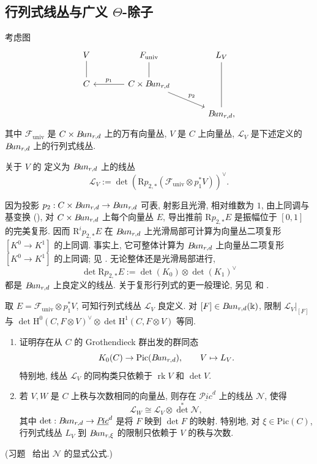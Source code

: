 \subsection{行列式线丛与广义 \texorpdfstring{$\Theta$}{Θ}-除子}\label{src:9.4.3-subsection}
考虑图
\[
\begin{tikzcd}[ampersand replacement=\&,column sep=large]
V\arrow[d,dash]\&\mathcal F_{\mathrm{univ}}\arrow[d,dash]\&\mathcal L_V\arrow[dd,dash]\\
C\&C\times\cBun_{r,d}\arrow[l,"p_1"']\arrow[dr,"p_2"]\&{}\\
\&{}\&\cBun_{r,d},
\end{tikzcd}
\]
其中 $\mathcal F_{\mathrm{univ}}$ 是 $C\times B\!un_{r,d}$ 上的万有向量丛, $V$ 是 $C$ 上向量丛, $\mathcal L_V$ 是下述定义的 $B\!un_{r,d}$ 上的行列式线丛.
\begin{definition}[行列式线丛]\label{src:9.4.15}
关于 $V$ 的 定义为 $B\!un_{r,d}$ 上的线丛
\[
\mathcal L_V:=\det\left(\mathrm Rp_{2,*}(\mathcal F_{\mathrm{univ}}\otimes p_1^*V)\right)^\vee.
\]
\end{definition}
\begin{remark}\label{src:9.4.16}
因为投影 $p_2:C\times B\!un_{r,d}\to B\!un_{r,d}$ 可表, 射影且光滑, 相对维数为 $1$, 由上同调与基变换 (), 对 $C\times B\!un_{r,d}$ 上每个向量丛 $E$, 导出推前 $\mathrm Rp_{2,*}E$ 是振幅位于 $[0,1]$ 的完美复形. 因而 $\mathrm R^ip_{2,*}E$ 在 $B\!un_{r,d}$ 上光滑局部可计算为向量丛二项复形 $[K^0\to K^1]$ 的上同调. 事实上, 它可整体计算为 $B\!un_{r,d}$ 上向量丛二项复形 $[K^0\to K^1]$ 的上同调; 见 \cite[命题 2.1.10]{HL10}. 无论整体还是光滑局部进行,
\[
\det\mathrm Rp_{2,*}E:=\det(K_0)\otimes\det(K_1)^\vee
\]
都是 $B\!un_{r,d}$ 上良定义的线丛. 关于复形行列式的更一般理论, 另见 \cite{KM76} 和 \cite[Tag 0FJI]{SP}.

取 $E=\mathcal F_{\mathrm{univ}}\otimes p_1^*V$, 可知行列式线丛 $\mathcal L_V$ 良定义. 对 $[F]\in B\!un_{r,d}(\Bbbk)$, 限制 $\mathcal L_V|_{[F]}$ 与 $\det\mathrm H^0(C,F\otimes V)^\vee\otimes\det\mathrm H^1(C,F\otimes V)$ 等同.
\end{remark}
\begin{exercise}\label{src:9.4.17}
\begin{enumerate}[(1)]
\item 证明存在从 $C$ 的 Grothendieck 群出发的群同态
\[
K_0(C)\to\operatorname{Pic}(B\!un_{r,d}),\qquad V\mapsto L_V.
\]
特别地, 线丛 $\mathcal L_V$ 的同构类只依赖于 $\operatorname{rk}V$ 和 $\det V$.
\item 若 $V,W$ 是 $C$ 上秩与次数相同的向量丛, 则存在 $\underline{\mathcal P\!ic}^d$ 上的线丛 $\mathcal N$, 使得
\[
\mathcal L_W\cong\mathcal L_V\otimes\det^*\mathcal N,
\]
其中 $\det:B\!un_{r,d}\to\underline{P\!ic}^d$ 是将 $F$ 映到 $\det F$ 的映射. 特别地, 对 $\xi\in\mathrm{Pic}(C)$, 行列式线丛 $L_V$ 到 $B\!un_{r,\xi}$ 的限制只依赖于 $V$ 的秩与次数.
\end{enumerate}
(习题~ 给出 $\mathcal N$ 的显式公式.)
\end{exercise}
